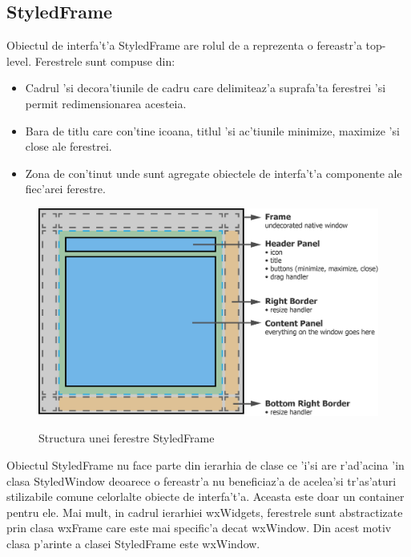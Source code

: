 
\subsection{StyledFrame}

Obiectul de interfa't'a StyledFrame are rolul de a reprezenta o fereastr'a top-level. Ferestrele sunt compuse din:

\begin{itemize}
\item Cadrul 'si decora'tiunile de cadru care delimiteaz'a suprafa'ta ferestrei 'si permit redimensionarea acesteia.
\item Bara de titlu care con'tine icoana, titlul 'si ac'tiunile minimize, maximize 'si close ale ferestrei.
\item Zona de con'tinut unde sunt agregate obiectele de interfa't'a componente ale fiec'arei ferestre.
\end{itemize}

\begin{center}
\begin{figure}[H]
    \centering
    \includegraphics[scale=0.8]{img/ch5_styledframe.png}
    \label{fig:fig_5_2}
    \caption{Structura unei ferestre StyledFrame}
\end{figure}
\end{center}

Obiectul StyledFrame nu face parte din ierarhia de clase ce 'i'si are r'ad'acina 'in clasa StyledWindow deoarece o fereastr'a nu beneficiaz'a de acelea'si tr'as'aturi stilizabile comune celorlalte obiecte de interfa't'a. Aceasta este doar un container pentru ele. Mai mult, in cadrul ierarhiei wxWidgets, ferestrele sunt abstractizate prin clasa wxFrame care este mai specific'a decat wxWindow. Din acest motiv clasa p'arinte a clasei StyledFrame este wxWindow.

